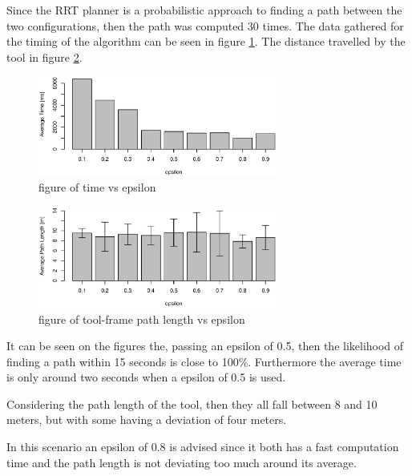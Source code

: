 \documentclass[12pt,a4paper]{article}
\begin{document}
Since the RRT planner is a probabilistic approach to finding a path between the two configurations, then the path was computed 30 times.
The data gathered for the timing of the algorithm can be seen in figure \ref{fig:timeVSepsilon}.
The distance travelled by the tool in figure \ref{fig:distVSepsilon}.

\begin{figure}[H]
\centering
\includegraphics[width=0.7\textwidth]{../statistics/timeVSepsilon}
\caption{figure of time vs epsilon}
\label{fig:timeVSepsilon}
\end{figure}


\begin{figure}[H]
\centering
\includegraphics[width=0.7\textwidth]{../statistics/distVSepsilon}
\caption{figure of tool-frame path length vs epsilon}
\label{fig:distVSepsilon}
\end{figure}


It can be seen on the figures the, passing an epsilon of 0.5, then the likelihood of finding a path within 15 seconds is close to 100\%.
Furthermore the average time is only around two seconds when a epsilon of 0.5 is used.

Considering the path length of the tool, then they all fall between 8 and 10 meters, but with some having a deviation of four meters.

In this scenario an epsilon of 0.8 is advised since it both has a fast computation time and the path length is not deviating too much around its average.
\end{document}
